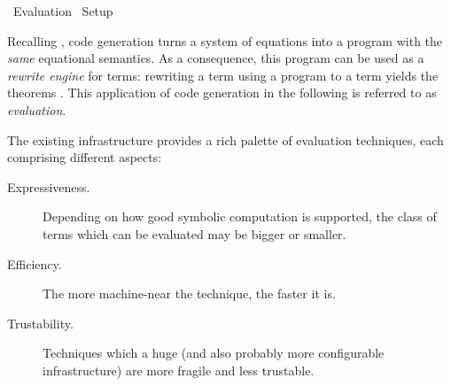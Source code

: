 %
\begin{isabellebody}%
\def\isabellecontext{Evaluation}%
%
\isadelimtheory
%
\endisadelimtheory
%
\isatagtheory
{}\isamarkupfalse%
\ Evaluation\isanewline
{}\ Setup\isanewline
{}%
\endisatagtheory
{\isafoldtheory}%
%
\isadelimtheory
%
\endisadelimtheory
%
\isamarkuptrue%
%
\begin{isamarkuptext}%
Recalling , code generation turns a system of
  equations into a program with the \emph{same} equational semantics.
  As a consequence, this program can be used as a \emph{rewrite
  engine} for terms: rewriting a term  using a program to a
  term  yields the theorems .  This
  application of code generation in the following is referred to as
  \emph{evaluation}.%
\end{isamarkuptext}%
\isamarkuptrue%
%
\isamarkuptrue%
%
\begin{isamarkuptext}%
The existing infrastructure provides a rich palette of evaluation
  techniques, each comprising different aspects:

  \begin{description}

    \item[Expressiveness.]  Depending on how good symbolic computation
      is supported, the class of terms which can be evaluated may be
      bigger or smaller.

    \item[Efficiency.]  The more machine-near the technique, the
      faster it is.

    \item[Trustability.]  Techniques which a huge (and also probably
      more configurable infrastructure) are more fragile and less
      trustable.


\end{description}
\end{isamarkuptext}
\end{isabellebody}
